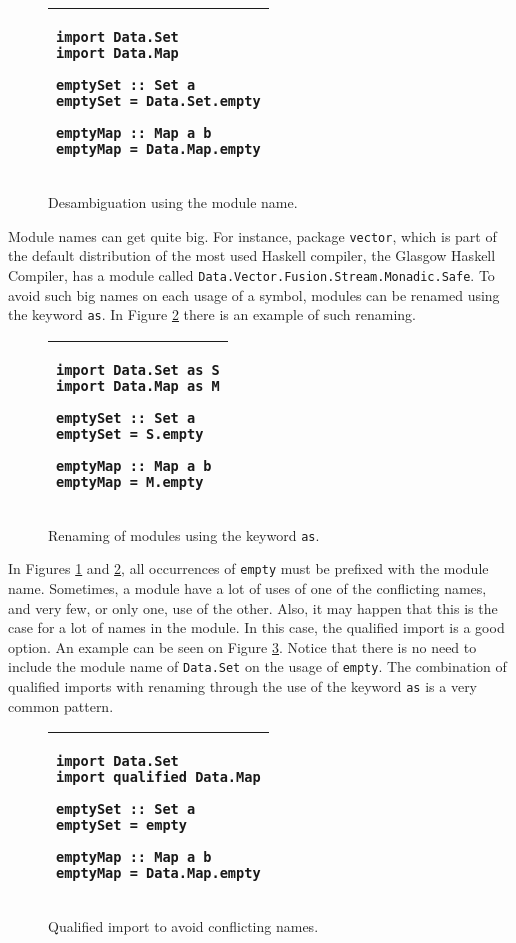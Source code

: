 \documentclass[msc]{ppgccufmg}
\begin{document}
\begin{figure}
\caption{Desambiguation using the module name.\label{prefixmod}}
\begin{tabular}{|p{\textwidth}|}
\hline
\begin{verbatim}
import Data.Set
import Data.Map

emptySet :: Set a
emptySet = Data.Set.empty

emptyMap :: Map a b
emptyMap = Data.Map.empty
\end{verbatim}
\\
\hline
\end{tabular}
\end{figure}

Module names can get quite big.
For instance, package \texttt{vector}, which is part of the default distribution of the most used Haskell compiler, the Glasgow Haskell Compiler, has a module called \texttt{Data.Vector.Fusion.Stream.Monadic.Safe}.
To avoid such big names on each usage of a symbol, modules can be renamed using the keyword \texttt{as}.
In Figure \ref{as} there is an example of such renaming.

\begin{figure}
\caption{Renaming of modules using the keyword \texttt{as}.\label{as}}
\begin{tabular}{|p{\textwidth}|}
\hline
\begin{verbatim}
import Data.Set as S
import Data.Map as M

emptySet :: Set a
emptySet = S.empty

emptyMap :: Map a b
emptyMap = M.empty
\end{verbatim}
\\
\hline
\end{tabular}
\end{figure}

In Figures \ref{prefixmod} and \ref{as}, all occurrences of \texttt{empty} must be prefixed with the module name.
Sometimes, a module have a lot of uses of one of the conflicting names, and very few, or only one, use of the other.
Also, it may happen that this is the case for a lot of names in the module.
In this case, the qualified import is a good option.
An example can be seen on Figure \ref{qual}.
Notice that there is no need to include the module name of \texttt{Data.Set} on the usage of \texttt{empty}.
The combination of qualified imports with renaming through the use of the keyword \texttt{as} is a very common pattern.

\begin{figure}
\caption{Qualified import to avoid conflicting names.\label{qual}}
\begin{tabular}{|p{\textwidth}|}
\hline
\begin{verbatim}
import Data.Set
import qualified Data.Map

emptySet :: Set a
emptySet = empty

emptyMap :: Map a b
emptyMap = Data.Map.empty
\end{verbatim}
\\
\hline
\end{tabular}
\end{figure}
\end{document}
